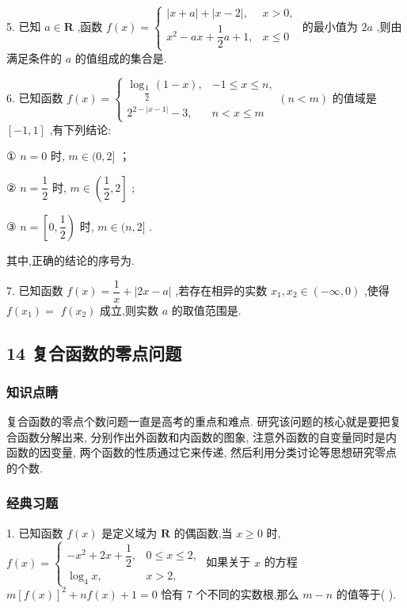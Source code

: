 5. 已知 $a \in  \mathbf{R}$ ,函数 $f\left( x\right)  = \left\{  \begin{array}{ll} \left| {x + a}\right|  + \left| {x - 2}\right| , & x > 0, \\  {x}^{2} - {ax} + \dfrac{1}{2}a + 1, & x \leq  0 \end{array}\right.$ 的最小值为 ${2a}$ ,则由满足条件的 $a$ 的值组成的集合是\blkda{}.

6. 已知函数 $f\left( x\right)  = \left\{  {\begin{array}{ll} {\log }_{\dfrac{1}{2}}\left( {1 - x}\right) , &  - 1 \leq  x \leq  n, \\  {2}^{2 - \left| {x - 1}\right| } - 3, & n < x \leq  m \end{array}\left( {n < m}\right) }\right.$ 的值域是 $\left\lbrack  {-1,1}\right\rbrack$ ,有下列结论:

① $n = 0$ 时, $m \in  (0,2\rbrack$ ；

② $n = \dfrac{1}{2}$ 时, $m \in  \left( {\dfrac{1}{2},2}\right\rbrack$ ;

③ $n = \left\lbrack  {0,\dfrac{1}{2}}\right)$ 时, $m \in  (n,2\rbrack$ .

其中,正确的结论的序号为\blkda{}.

7. 已知函数 $f\left( x\right)  = \dfrac{1}{x} + \left| {{2x} - a}\right|$ ,若存在相异的实数 ${x}_{1},{x}_{2} \in  \left( {-\infty ,0}\right)$ ,使得 $f\left( {x}_{1}\right)  =$  $f\left( {x}_{2}\right)$ 成立,则实数 $a$ 的取值范围是\blkda{}.

\subsection*{14 复合函数的零点问题}

\subsubsection*{知识点睛}

复合函数的零点个数问题一直是高考的重点和难点. 研究该问题的核心就是要把复合函数分解出来, 分别作出外函数和内函数的图象, 注意外函数的自变量同时是内函数的因变量, 两个函数的性质通过它来传递, 然后利用分类讨论等思想研究零点的个数.

\subsubsection*{经典习题}

1. 已知函数 $f\left( x\right)$ 是定义域为 $\mathbf{R}$ 的偶函数,当 $x \geq  0$ 时, $f\left( x\right)  = \left\{  \begin{array}{ll}  - {x}^{2} + {2x} + \dfrac{1}{2}, & 0 \leq  x \leq  2, \\  {\log }_{4}x, & x > 2, \end{array}\right.$ 如果关于 $x$ 的方程 $m{\left\lbrack  f\left( x\right) \right\rbrack  }^{2} + {nf}\left( x\right)  + 1 = 0$ 恰有 7 个不同的实数根,那么 $m - n$ 的值等于(   ).


